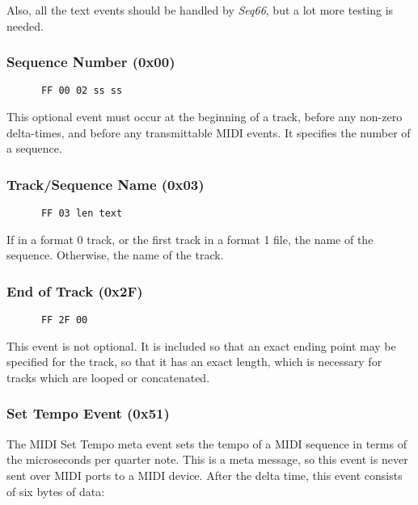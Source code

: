    Also, all the text events should be handled by \textsl{Seq66}, but
   a lot more testing is needed.

\subsubsection{Sequence Number (0x00)}
\label{subsubsec:midi_format_meta_sequence_number}

   \begin{verbatim}
      FF 00 02 ss ss
   \end{verbatim}

   This optional event must occur at the beginning of a track,
   before any non-zero delta-times, and before any transmittable MIDI
   events.  It specifies the number of a sequence.

\subsubsection{Track/Sequence Name (0x03)}
\label{subsubsec:midi_format_meta_sequence_name}

   \begin{verbatim}
      FF 03 len text
   \end{verbatim}

   If in a format 0 track, or the first track in a format 1 file, the name
   of the sequence.  Otherwise, the name of the track.

\subsubsection{End of Track (0x2F)}
\label{subsubsec:midi_format_meta_end_of_track}

   \begin{verbatim}
      FF 2F 00
   \end{verbatim}

   This event is not optional.  It is included so that an exact ending
   point may be specified for the track, so that it has an exact length,
   which is necessary for tracks which are looped or concatenated.

\subsubsection{Set Tempo Event (0x51)}
\label{subsubsec:midi_format_meta_set_tempo}

   The MIDI Set Tempo meta event sets the tempo of a MIDI sequence in terms of
   the microseconds per quarter note.  This is a meta message, so this event is
   never sent over MIDI ports to a MIDI device.
   After the delta time, this event consists of six bytes of data:

